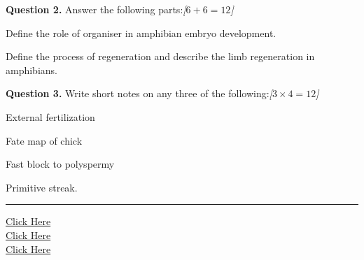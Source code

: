 \documentclass[11pt,a4paper]{article}
\newcommand{\pts}[1]{\hfill   \textit{[#1]}}
\begin{document}
\medskip


\noindent   \textbf{Question 2.} Answer the following parts:\pts{$6 + 6 = 12$}

\begin{parts}
  \item Define the role of organiser in amphibian embryo development.
  \item Define the process of regeneration and describe the limb regeneration in amphibians.
\end{parts}

\medskip


\noindent   \textbf{Question 3.} Write short notes on any three of the following:\pts{$3  \times 4 = 12$}

\begin{parts}
  \item External fertilization
  \item Fate map of chick
  \item Fast block to polyspermy
  \item Primitive streak.
\end{parts}

\vfill
\rule{\linewidth}{0.4pt}

\begin{center}\small
\href{https://bhu-exam.vercel.app/}{Click Here}\\[4pt]\href{https://me-aryan.vercel.app/}{Click Here}\\[4pt]\href{https://quashan-me.vercel.app/}{Click Here}
\end{center}
\end{document}
